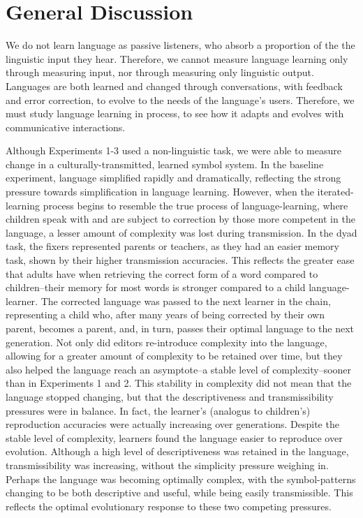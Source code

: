 \documentclass[10pt, letterpaper]{article}
\begin{document}
\hypertarget{general-discussion}{%
\section{General Discussion}\label{general-discussion}}

We do not learn language as passive listeners, who absorb a proportion
of the the linguistic input they hear. Therefore, we cannot measure
language learning only through measuring input, nor through measuring
only linguistic output. Languages are both learned and changed through
conversations, with feedback and error correction, to evolve to the
needs of the language's users. Therefore, we must study language
learning in process, to see how it adapts and evolves with communicative
interactions.

Although Experiments 1-3 used a non-linguistic task, we were able to
measure change in a culturally-transmitted, learned symbol system. In
the baseline experiment, language simplified rapidly and dramatically,
reflecting the strong pressure towards simplification in language
learning. However, when the iterated-learning process begins to resemble
the true process of language-learning, where children speak with and are
subject to correction by those more competent in the language, a lesser
amount of complexity was lost during transmission. In the dyad task, the
fixers represented parents or teachers, as they had an easier memory
task, shown by their higher transmission accuracies. This reflects the
greater ease that adults have when retrieving the correct form of a word
compared to children--their memory for most words is stronger compared
to a child language-learner. The corrected language was passed to the
next learner in the chain, representing a child who, after many years of
being corrected by their own parent, becomes a parent, and, in turn,
passes their optimal language to the next generation. Not only did
editors re-introduce complexity into the language, allowing for a
greater amount of complexity to be retained over time, but they also
helped the language reach an asymptote--a stable level of
complexity--sooner than in Experiments 1 and 2. This stability in
complexity did not mean that the language stopped changing, but that the
descriptiveness and transmissibility pressures were in balance. In fact,
the learner's (analogus to children's) reproduction accuracies were
actually increasing over generations. Despite the stable level of
complexity, learners found the language easier to reproduce over
evolution. Although a high level of descriptiveness was retained in the
language, transmissibility was increasing, without the simplicity
pressure weighing in. Perhaps the language was becoming optimally
complex, with the symbol-patterns changing to be both descriptive and
useful, while being easily transmissible. This reflects the optimal
evolutionary response to these two competing pressures.
\end{document}
